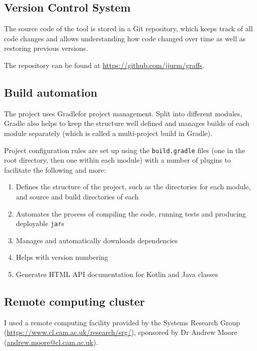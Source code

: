 \subsection{Version Control System}

The source code of the \graffs tool is stored in a Git repository, which keeps track of all code changes and allows understanding how code changed over time as well as restoring previous versions.

The repository can be found at \url{https://github.com/jjurm/graffs}.

\subsection{Build automation}

The project uses Gradle\citeneeded for project management.
Split into different modules, Gradle also helps to keep the structure well defined and manages builds of each module separately (which is called a multi-project build in Gradle).

Project configuration rules are set up using the \texttt{build.gradle} files (one in the root directory, then one within each module) with a number of plugins to facilitate the following and more:
\begin{enumerate}
    \item Defines the structure of the project, such as the directories for each module, and source and build directories of each
    \item Automates the process of compiling the code, running tests and producing deployable \texttt{jar}s
    \item Manages and automatically downloads dependencies
    \item Helps with version numbering
    \item Generates HTML API documentation for Kotlin and Java classes
\end{enumerate}



\subsection{Remote computing cluster}

I used a remote computing facility provided by the Systems Research Group (\url{https://www.cl.cam.ac.uk/research/srg/}), sponsored by Dr Andrew Moore (\url{andrew.moore@cl.cam.ac.uk}).

